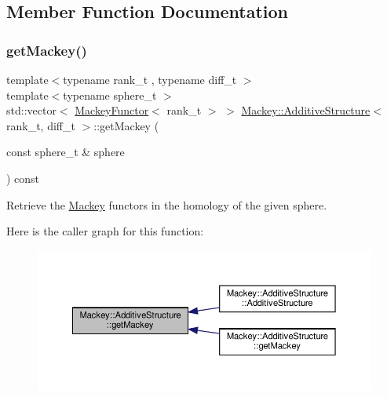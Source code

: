 \subsection{Member Function Documentation}
\mbox{\label{classMackey_1_1AdditiveStructure_ad18c28b9da58ec8b1c1579ace5953177}} 
\subsubsection{\texorpdfstring{get\+Mackey()}{getMackey()}\hspace{0.1cm}{\footnotesize\ttfamily [1/2]}}
{\footnotesize\ttfamily template$<$typename rank\+\_\+t , typename diff\+\_\+t $>$ \\
template$<$typename sphere\+\_\+t $>$ \\
std\+::vector$<$ \hyperlink{classMackey_1_1MackeyFunctor}{Mackey\+Functor}$<$ rank\+\_\+t $>$ $>$ \hyperlink{classMackey_1_1AdditiveStructure}{Mackey\+::\+Additive\+Structure}$<$ rank\+\_\+t, diff\+\_\+t $>$\+::get\+Mackey (\begin{DoxyParamCaption}\item[{const sphere\+\_\+t \&}]{sphere }\end{DoxyParamCaption}) const}



Retrieve the \hyperlink{namespaceMackey}{Mackey} functors in the homology of the given sphere. 

Here is the caller graph for this function\+:\nopagebreak
\begin{figure}[H]
\begin{center}
\leavevmode
\includegraphics[width=350pt]{classMackey_1_1AdditiveStructure_ad18c28b9da58ec8b1c1579ace5953177_icgraph}
\end{center}
\end{figure}
\mbox{\label{classMackey_1_1AdditiveStructure_a2638212adc9b1fdacf0a50d9fb23cf0d}} 
